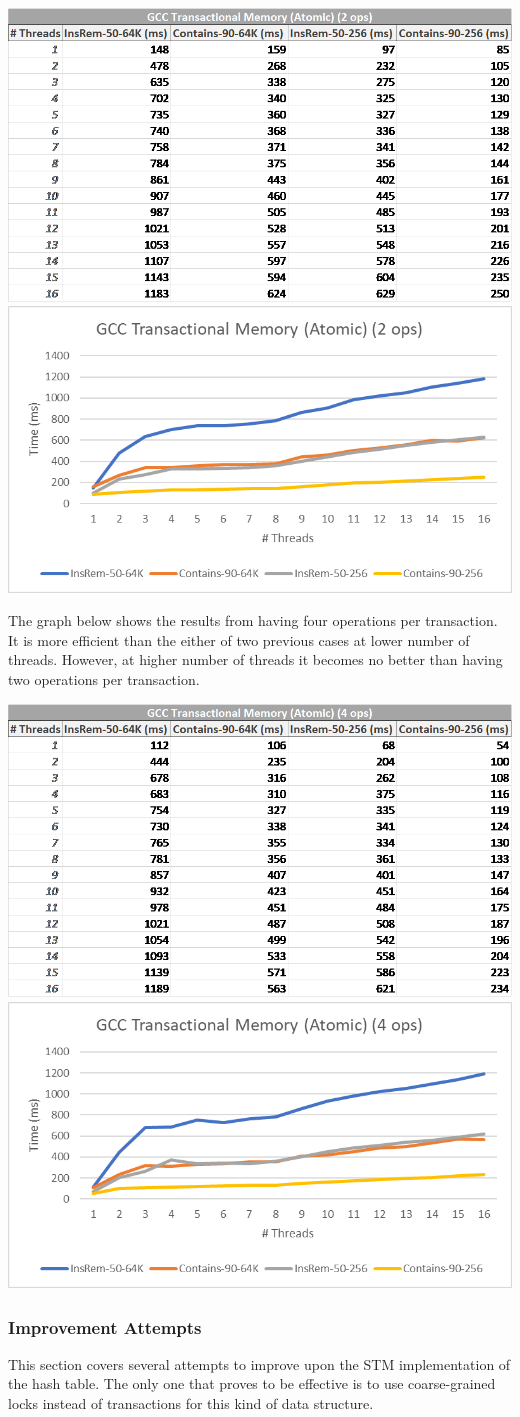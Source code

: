 \documentclass[11pt]{article} %
\begin{document}
\bigskip
\includegraphics[width=0.5\linewidth]{Table2.png}
\includegraphics[width=0.5\linewidth]{Graph2.png}

The graph below shows the results from having four operations per transaction. It is more efficient than the either of two previous cases at lower number of threads. However, at higher number of threads it becomes no better than having two operations per transaction.

\bigskip
\includegraphics[width=0.5\linewidth]{Table3.png}
\includegraphics[width=0.5\linewidth]{Graph3.png}

\subsubsection{Improvement Attempts}

This section covers several attempts to improve upon the STM implementation of the hash table. The only one that proves to be effective is to use coarse-grained locks instead of transactions for this kind of data structure.
\end{document}
